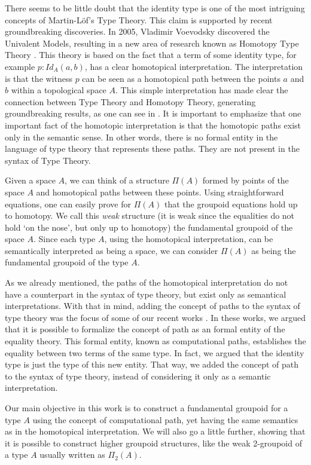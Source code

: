 \documentclass[12pt, a4paper,  oneside, headinclude,footinclude, BCOR5mm]{scrartcl}
\begin{document}
There seems to be little doubt that the identity type is one of the most intriguing concepts of  Martin-L\"of's Type Theory. This claim is supported by recent groundbreaking discoveries. In 2005, Vladimir Voevodsky \cite{Vlad1} discovered the Univalent Models, resulting in a new area of research known as Homotopy Type Theory \cite{Steve1}. This theory is based on the fact that a term of some identity type, for example $p: Id_{A}(a,b)$, has a clear homotopical interpretation. The interpretation is that the witness $p$ can be seen as a homotopical path between the points $a$ and $b$ within a topological space $A$. This simple interpretation has made clear the connection between Type Theory and Homotopy Theory, generating groundbreaking results, as one can see in \cite{hott,Steve1}. It is important to emphasize that one important fact of the homotopic interpretation is that the homotopic paths exist only in the semantic sense. In other words, there is no formal entity in the language of type theory that represents these paths. They are not present in the syntax of Type Theory.

Given a space $A$, we can think of a structure $\Pi(A)$ formed by points of the space $A$ and homotopical paths between these points. Using straightforward equations, one can easily prove for $\Pi(A)$ that the groupoid equations hold up to homotopy. We call this \emph{weak} structure (it is weak since the equalities do not hold `on the nose', but only up to homotopy) the fundamental groupoid of the space $A$. Since each type $A$, using the homotopical interpretation, can be semantically interpreted as being a space, we can consider $\Pi(A)$ as being the fundamental groupoid of the type $A$.

As we already mentioned, the paths of the homotopical interpretation do not have a counterpart in the syntax of type theory, but exist only as semantical interpretations. With that in mind, adding the concept of paths to the syntax of type theory was the focus of some of our recent works \cite{Ruy1, Art1en, Ruy5}. In these works, we argued that it is possible to formalize the concept of path as an formal entity of the equality theory. This formal entity, known as computational paths, establishes the equality between two terms of the same type. In fact, we argued that the identity type is just the type of this new entity. That way, we added the concept of path to the syntax of type theory, instead of considering it only as a semantic interpretation.

Our main objective in this work is to construct a fundamental groupoid for a type $A$ using the concept of computational path, yet having the same semantics as in the homotopical interpretation. We will also go a little further, showing that it is possible to construct higher groupoid structures, like the weak 2-groupoid of a type $A$ usually written as $\Pi_{2}(A)$.
\end{document}
